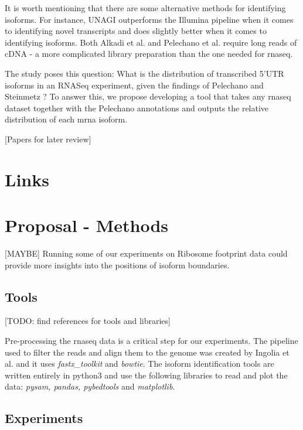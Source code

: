 \documentclass[12pt]{article}
\begin{document}
It is worth mentioning that there are some alternative methods for identifying isoforms. For instance, UNAGI\cite{Alkadi2020} outperforms the Illumina pipeline when it comes to identifying novel transcripts and does slightly better when it comes to identifying isoforms. Both Alkadi et al. \cite{Alkadi2020} and Pelechano et al. \cite{Pelechano2013} require long reads of cDNA - a more complicated library preparation than the one needed for \acrshort{rnaseq}.

The study poses this question: What is the distribution of transcribed 5’UTR isoforms in an RNASeq experiment, given the findings of Pelechano and Steinmetz \cite{Pelechano2013}? To answer this, we propose developing a tool that takes any \acrshort{rnaseq} dataset together with the Pelechano annotations and outputs the relative distribution of each \acrshort{mrna} isoform. 

{\tiny [Papers for later review]} \cite{Kim2009} \cite{Lee2002} \cite{ReixachsSol2020} \cite{Thorrez2008} 

\section{Links}


\section{Proposal - Methods}\label{methods}


{\tiny[MAYBE]}
Running some of our experiments on Ribosome footprint data could provide more insights into the positions of isoform boundaries.

\subsection{Tools}\label{tools}
{\tiny[TODO: find references for tools and libraries]}

Pre-processing the \acrshort{rnaseq} data is a critical step for our experiments. The pipeline used to filter the reads and align them to the genome was created by Ingolia et al. \cite{Ingolia2012} and it uses \textit{fastx\_toolkit} and \textit{bowtie}. The isoform identification tools are written entirely in python3 and use the following libraries to read and plot the data: \textit{pysam, pandas, pybedtools} and \textit{matplotlib}. 

\subsection{Experiments}\label{experiments}
\end{document}
